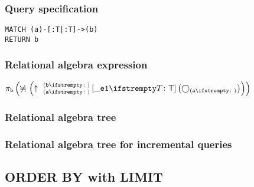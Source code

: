 \subsubsection*{Query specification}

\begin{lstlisting}
MATCH (a)-[:T|:T]->(b)
RETURN b
\end{lstlisting}

\subsubsection*{Relational algebra expression}

$\projection{\var{b}} \left(\alldifferent{} \left(\expandout{a}{b}{}{\_e1}{T} \left(\getvertices{a}{}\right)\right)\right)$

\subsubsection*{Relational algebra tree}


\subsubsection*{Relational algebra tree for incremental queries}


\subsection{ORDER BY with LIMIT}

